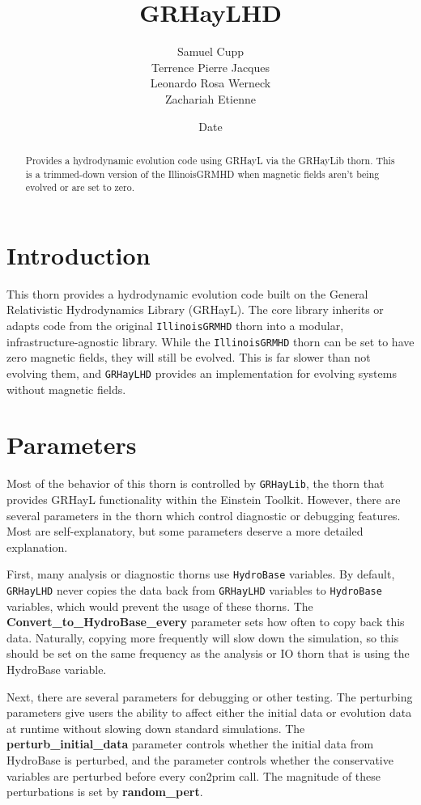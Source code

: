 \documentclass{article}
\newcommand{\ghd}{\texttt{GRHayLHD}\xspace}
\newcommand{\igm}{\texttt{IllinoisGRMHD}\xspace}
\newcommand{\hydrobase}{\texttt{HydroBase}\xspace}
\begin{document}
\title{GRHayLHD}
\author{Samuel Cupp \\ Terrence Pierre Jacques \\ Leonardo Rosa Werneck \\ Zachariah Etienne}
\date{$ $Date$ $}

\maketitle


\begin{abstract}
Provides a hydrodynamic evolution code using GRHayL via the
GRHayLib thorn. This is a trimmed-down version of the IllinoisGRMHD
when magnetic fields aren't being evolved or are set to zero.
\end{abstract}

\section{Introduction}

This thorn provides a hydrodynamic evolution code built on
the General Relativistic Hydrodynamics Library (GRHayL).
The core library inherits or adapts code from the original
\igm thorn into a modular, infrastructure-agnostic
library. While the \igm thorn can be set to have
zero magnetic fields, they will still be evolved. This
is far slower than not evolving them, and \ghd provides an
implementation for evolving systems without magnetic
fields.

\section{Parameters}

Most of the behavior of this thorn is controlled by
\texttt{GRHayLib}, the thorn that provides GRHayL functionality
within the Einstein Toolkit. However, there are several
parameters in the thorn which control diagnostic or debugging
features. Most are self-explanatory, but some parameters deserve
a more detailed explanation.

First, many analysis or diagnostic thorns use \hydrobase variables.
By default, \ghd never copies the data back from \ghd variables
to \hydrobase variables, which would prevent the usage of these
thorns. The \textbf{Convert\_to\_HydroBase\_every} parameter
sets how often to copy back this data. Naturally, copying more
frequently will slow down the simulation, so this should be set
on the same frequency as the analysis or IO thorn that is using
the HydroBase variable.

Next, there are several parameters for debugging or other testing.
The perturbing parameters give users the ability to affect either
the initial data or evolution data at runtime without slowing down
standard simulations. The \textbf{perturb\_initial\_data} parameter
controls whether the initial data from HydroBase is perturbed, and
the  parameter controls whether
the conservative variables are perturbed before every con2prim call.
The magnitude of these perturbations is set by \textbf{random\_pert}.

\end{document}
